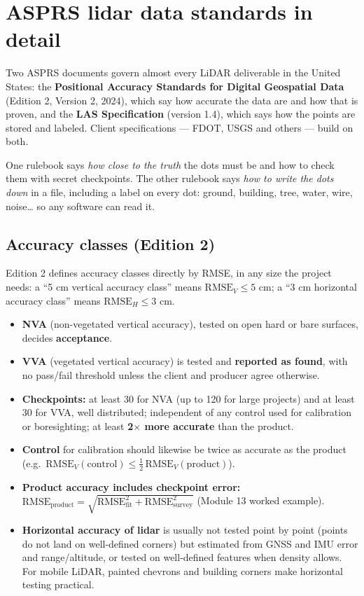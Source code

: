 \section{ASPRS lidar data standards in detail}
Two ASPRS documents govern almost every LiDAR deliverable in the United States: the \textbf{Positional Accuracy Standards for Digital Geospatial Data} (Edition 2, Version 2, 2024), which say how accurate the data are and how that is proven, and the \textbf{LAS Specification} (version 1.4), which says how the points are stored and labeled. Client specifications --- FDOT, USGS and others --- build on both.

\begin{kid}
One rulebook says \emph{how close to the truth} the dots must be and how to check them with secret checkpoints. The other rulebook says \emph{how to write the dots down} in a file, including a label on every dot: ground, building, tree, water, wire, noise\ldots{} so any software can read it.
\end{kid}

\subsection{Accuracy classes (Edition 2)}
\begin{eng}
Edition 2 defines accuracy classes directly by RMSE, in any size the project needs: a ``5 cm vertical accuracy class'' means $\text{RMSE}_V\le5$ cm; a ``3 cm horizontal accuracy class'' means $\text{RMSE}_H\le3$ cm.
\begin{itemize}
\item \textbf{NVA} (non-vegetated vertical accuracy), tested on open hard or bare surfaces, decides \textbf{acceptance}.
\item \textbf{VVA} (vegetated vertical accuracy) is tested and \textbf{reported as found}, with no pass/fail threshold unless the client and producer agree otherwise.
\item \textbf{Checkpoints:} at least 30 for NVA (up to 120 for large projects) and at least 30 for VVA, well distributed; independent of any control used for calibration or boresighting; at least \textbf{2$\times$ more accurate} than the product.
\item \textbf{Control} for calibration should likewise be twice as accurate as the product (e.g.\ $\text{RMSE}_V(\text{control})\le\tfrac12\,\text{RMSE}_V(\text{product})$).
\item \textbf{Product accuracy includes checkpoint error:} $\text{RMSE}_{\text{product}}=\sqrt{\text{RMSE}_{\text{fit}}^2+\text{RMSE}_{\text{survey}}^2}$ (Module 13 worked example).
\item \textbf{Horizontal accuracy of lidar} is usually not tested point by point (points do not land on well-defined corners) but estimated from GNSS and IMU error and range/altitude, or tested on well-defined features when density allows. For mobile LiDAR, painted chevrons and building corners make horizontal testing practical.
\end{itemize}
\end{eng}

